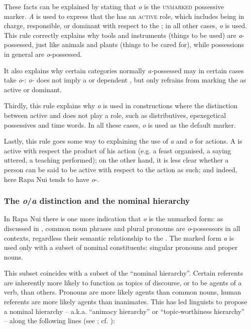 These facts can be explained by stating that \textit{o} is the \textsc{unmarked} possessive marker. \textit{{\ꞌ}A} is used to express that the  has an \textsc{active} role, which includes being in charge, responsible, or dominant with respect to the ; in all other cases, \textit{o} is used. This rule correctly explains why tools and instruments (things to be used) are \textit{a}{}-possessed, just like animals and plants (things to be cared for), while possessions in general are \textit{o}{}-possessed.

It also explains why certain categories normally \textit{a-}possessed may in certain cases take \textit{o}{}-: \textit{o-} does not imply a  or dependent , but only refrains from marking the  as active or dominant. 

Thirdly, this rule explains why \textit{o} is used in constructions where the distinction between active and  does not play a role, such as distributives, epexegetical possessives and time words. In all these cases, \textit{o} is used as the default marker.

Lastly, this rule goes some way to explaining the use of \textit{a} and \textit{o}  for actions. A  is active with respect the product of his action (e.g. a feast organised, a saying uttered, a teaching performed); on the other hand, it is less clear whether a person can be said to be active with respect to the action as such; and indeed, here Rapa Nui tends to have \textit{o}{}-.

\subsubsection[The o/a distinction and the nominal hierarchy]{The \textit{o}/\textit{a} distinction and the nominal hierarchy}\label{sec:6.3.4.4}
In Rapa Nui there is one more indication that \textit{o} is the unmarked form: as discussed in , common noun phrases and plural pronouns are \textit{o}{}-possessors in all contexts, regardless their semantic relationship to the . The marked form \textit{{\ꞌ}a} is used only with a subset of nominal constituents: singular pronouns and proper nouns. 

This subset coincides with a subset of the “nominal hierarchy”. Certain referents are inherently more likely to function as topics of discourse, or to be agents of a verb, than others. Pronouns are more likely agents than common nouns, human referents are more likely agents than inanimates. This has led linguists to propose a nominal hierarchy – a.k.a. “animacy hierarchy” or “topic-worthiness hierarchy” – along the following lines (see \citealt[150]{Payne1997}; cf. \citealt[413]{Foley2007}):

